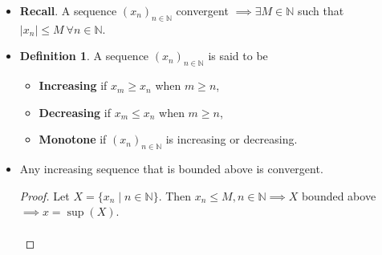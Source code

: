 \documentclass{article}
\newcommand{\R}{\mathbb{R}}
\newcommand{\N}{\mathbb{N}}
\newcommand{\seq}[2]{(#1_{#2})_{#2 \in \N}}
\newcommand{\set}[2]{\{ #1 \mid #2 \}}
\newcommand{\?}{\stackrel{?}{=}}
\newcommand{\smallblacksquare}{\rule{0.5em}{0.5em}}
\theoremstyle{definition} %
\newtheorem{definition}[subsection]{Definition} %
\begin{document}
\begin{itemize}
    \begin{proof}
        Let $\seq{x}{n}$ be a convergent sequence, that is, there exists some $x \in \R$ such that for all $\varepsilon > 0$, there exists some $N(\varepsilon) \in \N$ and
        $$|x - x_n| \leq \varepsilon \ \forall n \geq N(\varepsilon).$$
        In particular, take for $\varepsilon = 1$, there is $N(1)$ such that
        $$|x_n - x| \leq 1 \ \forall n \geq N(1).$$
        Recall the reverse triangle inequality,
        \begin{alignat*}{2}
        |x_n| - |x| &\leq |x - x_n| &&\leq 1 \quad n \geq N(1) \\
        \implies \, |x_n| &\leq 1 + |x| \quad &&n \geq N(1)
        \end{alignat*}
        Let $M = \max\{|x_0|, |x_1|, \ldots, |x_{N(1) - 1}|, 1 + |x|\}$. Then certainly
        \begin{align*}
            |x_n| &\leq M \qquad n \leq N(1) \\
            |x_n| &\leq M \qquad n \geq N(1) \\
            \implies |x_n| &\leq M \qquad \forall n \in \N.
        \end{align*}
    \end{proof}
    \item \textbf{Recall}. A sequence $(x_n)_{n \in \N}$ convergent $\implies \exists M \in \N$ such that $|x_n| \leq M \ \forall n \in \N$.
    \item[]
    \begin{definition}
        A sequence $\seq{x}{n}$ is said to be
    \begin{itemize}[label=\smallblacksquare]
        \item \textbf{Increasing} if $x_m \geq x_n$ when $m \geq n$,
        \item \textbf{Decreasing} if $x_m \leq x_n$ when $m \geq n$,
        \item \textbf{Monotone} if $\seq{x}{n}$ is increasing or decreasing.
    \end{itemize}
    \end{definition}
    \item[]
    \begin{lemma}
        Any increasing sequence that is bounded above is convergent.
    \end{lemma}
    \begin{proof}
        Let $X = \set{x_n}{n \in \N}$. Then $x_n \leq M, n \in \N \implies X$ bounded above $\implies x = \sup(X)$. \\\\

\end{proof}
\end{itemize}
\end{document}

